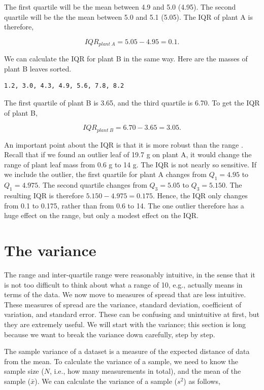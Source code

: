 \documentclass[
]{scrbook}
\begin{document}
The first quartile will be the mean between 4.9 and 5.0 (4.95).
The second quartile will be the the mean between 5.0 and 5.1 (5.05).
The IQR of plant A is therefore,

\[IQR_{plant\:A} = 5.05 - 4.95 = 0.1.\]

We can calculate the IQR for plant B in the same way.
Here are the masses of plant B leaves sorted.

\begin{verbatim}
1.2, 3.0, 4.3, 4.9, 5.6, 7.8, 8.2
\end{verbatim}

The first quartile of plant B is 3.65, and the third quartile is 6.70.
To get the IQR of plant B,

\[IQR_{plant\:B} = 6.70 - 3.65 = 3.05.\]

An important point about the IQR is that it is more robust than the range \citep{Dytham2011}.
Recall that if we found an outlier leaf of 19.7 g on plant A, it would change the range of plant leaf mass from 0.6 g to 14 g.
The IQR is not nearly so sensitive.
If we include the outlier, the first quartile for plant A changes from \(Q_{1} = 4.95\) to \(Q_{1} = 4.975\).
The second quartile changes from \(Q_{3} = 5.05\) to \(Q_{3} = 5.150\).
The resulting IQR is therefore \(5.150 - 4.975 = 0.175\).
Hence, the IQR only changes from 0.1 to 0.175, rather than from 0.6 to 14.
The one outlier therefore has a huge effect on the range, but only a modest effect on the IQR.

\hypertarget{the-variance}{%
\section{The variance}\label{the-variance}}

The range and inter-quartile range were reasonably intuitive, in the sense that it is not too difficult to think about what a range of 10, e.g., actually means in terms of the data.
We now move to measures of spread that are less intuitive.
These measures of spread are the variance, standard deviation, coefficient of variation, and standard error.
These can be confusing and unintuitive at first, but they are extremely useful.
We will start with the variance; this section is long because we want to break the variance down carefully, step by step.

The sample variance of a dataset is a measure of the expected distance of data from the mean.
To calculate the variance of a sample, we need to know the sample size (\(N\), i.e., how many measurements in total), and the mean of the sample (\(\bar{x}\)).
We can calculate the variance of a sample (\(s^{2}\)) as follows,
\end{document}
